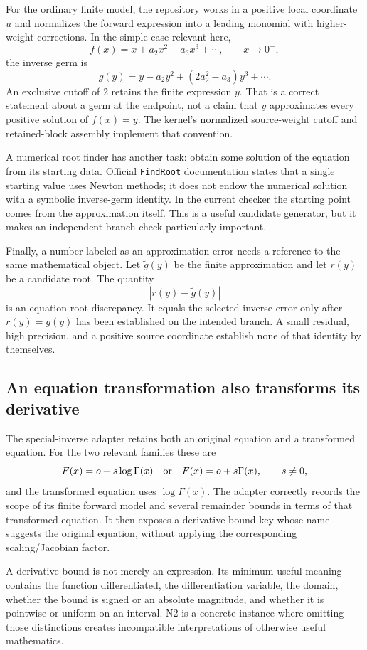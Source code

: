 \documentclass[11pt,letterpaper]{article}
\newcommand{\code}[1]{{\small\nolinkurl{#1}}}
\begin{document}
For the ordinary finite model, the repository works in a positive local coordinate $u$ and normalizes the forward expression into a leading monomial with higher-weight corrections. In the simple case relevant here,
\[
 f(x)=x+a_2x^2+a_3x^3+\cdots,\qquad x\to0^+,
\]
the inverse germ is
\[
 g(y)=y-a_2y^2+(2a_2^2-a_3)y^3+\cdots.
\]
An exclusive cutoff of $2$ retains the finite expression $y$. That is a correct statement about a germ at the endpoint, not a claim that $y$ approximates every positive solution of $f(x)=y$. The kernel's normalized source-weight cutoff and retained-block assembly implement that convention.\cite{core}

A numerical root finder has another task: obtain some solution of the equation from its starting data. Official \code{FindRoot} documentation states that a single starting value uses Newton methods; it does not endow the numerical solution with a symbolic inverse-germ identity. In the current checker the starting point comes from the approximation itself. This is a useful candidate generator, but it makes an independent branch check particularly important.\cite{findroot,numerical}

Finally, a number labeled as an approximation error needs a reference to the same mathematical object. Let $\widetilde g(y)$ be the finite approximation and let $r(y)$ be a candidate root. The quantity
\[
 |r(y)-\widetilde g(y)|
\]
is an equation-root discrepancy. It equals the selected inverse error only after $r(y)=g(y)$ has been established on the intended branch. A small residual, high precision, and a positive source coordinate establish none of that identity by themselves.

\subsection{An equation transformation also transforms its derivative}

The special-inverse adapter retains both an original equation and a transformed equation. For the two relevant families these are
\[
 F(x)=o+s\log\Gamma(x)
 \quad\hbox{or}\quad
 F(x)=o+s\Gamma(x),\qquad s\ne0,
\]
and the transformed equation uses $\log\Gamma(x)$. The adapter correctly records the scope of its finite forward model and several remainder bounds in terms of that transformed equation. It then exposes a derivative-bound key whose name suggests the original equation, without applying the corresponding scaling/Jacobian factor.\cite{special}

A derivative bound is not merely an expression. Its minimum useful meaning contains the function differentiated, the differentiation variable, the domain, whether the bound is signed or an absolute magnitude, and whether it is pointwise or uniform on an interval. N2 is a concrete instance where omitting those distinctions creates incompatible interpretations of otherwise useful mathematics.
\end{document}
